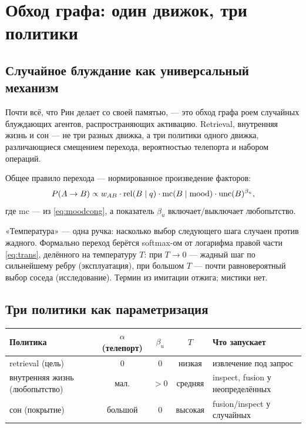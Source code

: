 \chapter{Обход графа: один движок, три политики}
\label{ch:walker}

\section{Случайное блуждание как универсальный механизм}

Почти всё, что Рин делает со своей памятью, --- это обход графа роем случайных
блуждающих агентов, распространяющих активацию. Retrieval, внутренняя жизнь
и сон --- не три разных движка, а три политики одного движка, различающиеся
смещением перехода, вероятностью телепорта и набором операций.

Общее правило перехода --- нормированное произведение факторов:
\begin{equation}
P(A \to B) \propto
w_{AB}
\cdot \mathrm{rel}(B \mid q)
\cdot \mathrm{mc}(B \mid \mathrm{mood})
\cdot \mathrm{unc}(B)^{\beta_u},
\label{eq:trans}
\end{equation}
где $\mathrm{mc}$ --- из \eqref{eq:moodcong}, а показатель $\beta_u$
включает/выключает любопытство.

\begin{intuition}
«Температура» --- одна ручка: насколько выбор следующего шага случаен против
жадного. Формально переход берётся softmax-ом от логарифма правой части
\eqref{eq:trans}, делённого на температуру $T$: при $T \to 0$ --- жадный шаг по
сильнейшему ребру (эксплуатация), при большом $T$ --- почти равновероятный
выбор соседа (исследование). Термин из имитации отжига; мистики нет.
\end{intuition}

\section{Три политики как параметризация}

\begin{center}
\begin{tabular}{>{\raggedright\arraybackslash}p{} c c c >{\raggedright\arraybackslash}p{}}
\toprule
Политика & $\alpha$ (телепорт) & $\beta_u$ & $T$ & Что запускает \\
\midrule
retrieval (цель) & $0$ & $0$ & низкая & извлечение под запрос \\
внутренняя жизнь (любопытство) & мал. & $>0$ & средняя & inspect, fusion у неопределённых \\
сон (покрытие) & большой & $0$ & высокая & fusion/inspect у случайных \\
\bottomrule
\end{tabular}
\end{center}

